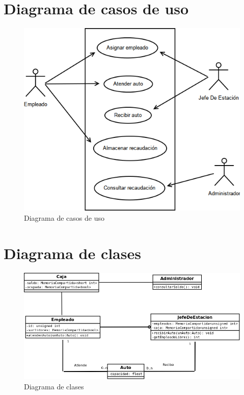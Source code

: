 \documentclass[12pt,a4paper,titlepage,oneside]{article}
\begin{document}
\section{Diagrama de casos de uso}
\begin{figure}[hbtp]
\begin{center}
\includegraphics[scale=0.6]{diagramaDeCasosDeUso.png} 
\end{center}
\caption{Diagrama de casos de uso}
\end{figure}

\section{Diagrama de clases}
\begin{figure}[hbtp]
\centering
\includegraphics[scale=0.4]{diagramaDeClases.png}
\caption{Diagrama de clases}
\end{figure}
\end{document}
